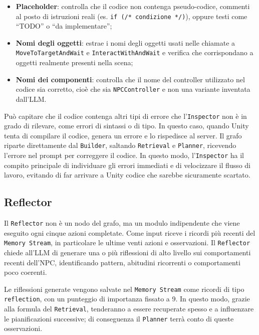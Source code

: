 \begin{itemize}
	\item \textbf{Placeholder}: controlla che il codice non contenga pseudo-codice, commenti al posto di istruzioni reali (es. \texttt{if (/* condizione */)}), oppure testi come ``TODO'' o ``da implementare'';
	\item \textbf{Nomi degli oggetti}: estrae i nomi degli oggetti usati nelle chiamate a \texttt{MoveToTargetAndWait} e \texttt{InteractWithAndWait} e verifica che corrispondano a oggetti realmente presenti nella scena;
	\item \textbf{Nomi dei componenti}: controlla che il nome del controller utilizzato nel codice sia corretto, cioè che sia \texttt{NPCController} e non una variante inventata dall'LLM.
\end{itemize}

Può capitare che il codice contenga altri tipi di errore che l'\texttt{Inspector} non è in grado di rilevare, come errori di sintassi o di tipo. In questo caso, quando Unity tenta di compilare il codice, genera un errore e lo rispedisce al server. Il grafo riparte direttamente dal \texttt{Builder}, saltando \texttt{Retrieval} e \texttt{Planner}, ricevendo l'errore nel prompt per correggere il codice. In questo modo, l'\texttt{Inspector} ha il compito principale di individuare gli errori immediati e di velocizzare il flusso di lavoro, evitando di far arrivare a Unity codice che sarebbe sicuramente scartato.

\subsection{Reflector}

Il \texttt{Reflector} non è un nodo del grafo, ma un modulo indipendente che viene eseguito ogni cinque azioni completate. Come input riceve i ricordi più recenti del \texttt{Memory Stream}, in particolare le ultime venti azioni e osservazioni. Il \texttt{Reflector} chiede all'LLM di generare una o più riflessioni di alto livello sui comportamenti recenti dell'NPC, identificando pattern, abitudini ricorrenti o comportamenti poco coerenti.

Le riflessioni generate vengono salvate nel \texttt{Memory Stream} come ricordi di tipo \texttt{reflection}, con un punteggio di importanza fissato a 9. In questo modo, grazie alla formula del \texttt{Retrieval}, tenderanno a essere recuperate spesso e a influenzare le pianificazioni successive; di conseguenza il \texttt{Planner} terrà conto di queste osservazioni.

